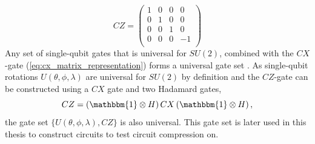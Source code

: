	\begin{equation}
		\label{eq:cz_gate}
		CZ=
		\begin{pmatrix}
			1 & 0 & 0 & 0 \\
			0 & 1 & 0 & 0 \\
			0 & 0 & 1 & 0 \\
			0 & 0 & 0 & -1 \\
		\end{pmatrix}
	\end{equation}
	Any set of single-qubit gates that is universal for $SU\left(2\right)$, combined with the $CX$-gate (\ref{eq:cx_matrix_representation}) forms a universal gate set \cite{Nielsen2010-xd}. As single-qubit rotations $U\left(\theta,\phi,\lambda\right)$ are universal for $SU\left(2\right)$ by definition and the $CZ$-gate can be constructed using a $CX$ gate and two Hadamard gates,
	\begin{equation}
		\label{eq:cz_construction_with_cx}
		CZ=\left(\mathbbm{1}\otimes H\right)CX\left(\mathbbm{1}\otimes H\right),
	\end{equation}
	the gate set $\{U\left(\theta,\phi,\lambda\right),CZ\}$ is also universal.
	This gate set is later used in this thesis to construct circuits to test circuit compression on.